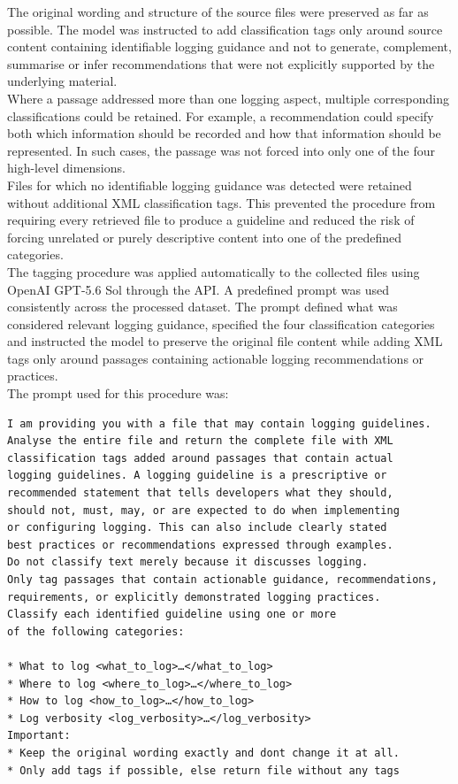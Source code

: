 The original wording and structure of the source files were preserved as far as
possible. The model was instructed to add classification tags only around source
content containing identifiable logging guidance and not to generate, complement,
summarise or infer recommendations that were not explicitly supported by the
underlying material.
\\
Where a passage addressed more than one logging aspect, multiple corresponding
classifications could be retained. For example, a recommendation could specify both
which information should be recorded and how that information should be represented.
In such cases, the passage was not forced into only one of the four high-level
dimensions.
\\
Files for which no identifiable logging guidance was detected were retained without
additional XML classification tags. This prevented the procedure from requiring every
retrieved file to produce a guideline and reduced the risk of forcing unrelated or
purely descriptive content into one of the predefined categories.
\\
The tagging procedure was applied automatically to the collected files using
OpenAI GPT-5.6 Sol through the API. A predefined prompt was used consistently
across the processed dataset. The prompt defined what was considered relevant
logging guidance, specified the four classification categories and instructed
the model to preserve the original file content while adding XML tags only around
passages containing actionable logging recommendations or practices.
\\
The prompt used for this procedure was:

\begin{listing}[H]
\begin{verbatim}
I am providing you with a file that may contain logging guidelines.
Analyse the entire file and return the complete file with XML
classification tags added around passages that contain actual
logging guidelines. A logging guideline is a prescriptive or
recommended statement that tells developers what they should,
should not, must, may, or are expected to do when implementing
or configuring logging. This can also include clearly stated
best practices or recommendations expressed through examples.
Do not classify text merely because it discusses logging.
Only tag passages that contain actionable guidance, recommendations,
requirements, or explicitly demonstrated logging practices.
Classify each identified guideline using one or more
of the following categories:

* What to log <what_to_log>…</what_to_log>
* Where to log <where_to_log>…</where_to_log>
* How to log <how_to_log>…</how_to_log>
* Log verbosity <log_verbosity>…</log_verbosity>
Important:
* Keep the original wording exactly and dont change it at all.
* Only add tags if possible, else return file without any tags
\end{verbatim}
\caption{Prompt for logging content identification and XML classification}
\label{lst:prompt_xml_classification}
\end{listing}

